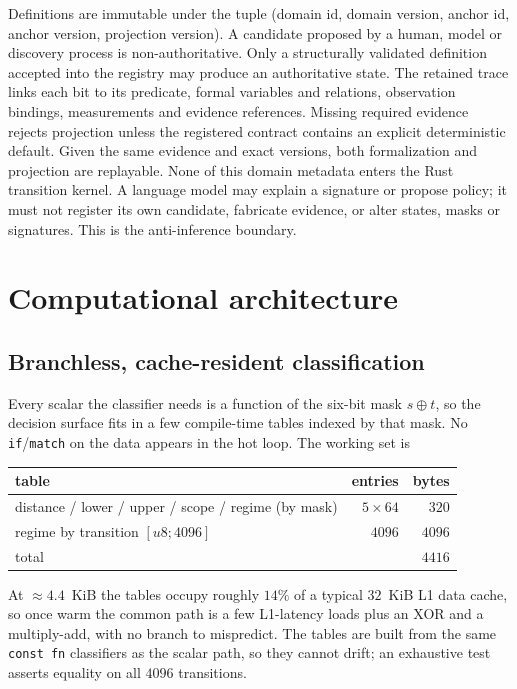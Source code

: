 \documentclass[11pt,a4paper]{article}
\begin{document}
Definitions are immutable under the tuple (domain id, domain version, anchor id,
anchor version, projection version). A candidate proposed by a human, model or
discovery process is non-authoritative. Only a structurally validated definition
accepted into the registry may produce an authoritative state. The retained trace
links each bit to its predicate, formal variables and relations, observation
bindings, measurements and evidence references. Missing required evidence rejects
projection unless the registered contract contains an explicit deterministic
default. Given the same evidence and exact versions, both formalization and
projection are replayable. None of this domain metadata enters the Rust transition
kernel. A language model may explain a signature or propose policy; it must not
register its own candidate, fabricate evidence, or alter states, masks or
signatures. This is the anti-inference boundary.

\section{Computational architecture}
\subsection{Branchless, cache-resident classification}
Every scalar the classifier needs is a function of the six-bit mask $s\oplus t$,
so the decision surface fits in a few compile-time tables indexed by that mask. No
\texttt{if}/\texttt{match} on the data appears in the hot loop. The working set is
\begin{center}
\begin{tabular}{lrr}
\toprule
table & entries & bytes \\
\midrule
distance / lower / upper / scope / regime (by mask) & $5\times 64$ & $320$ \\
regime by transition $[u8;4096]$ & $4096$ & $4096$ \\
\midrule
total & & $4416$ \\
\bottomrule
\end{tabular}
\end{center}
At $\approx 4.4$~KiB the tables occupy roughly $14\%$ of a typical $32$~KiB L1 data
cache, so once warm the common path is a few L1-latency loads plus an XOR and a
multiply-add, with no branch to mispredict. The tables are built from the same
\texttt{const fn} classifiers as the scalar path, so they cannot drift; an
exhaustive test asserts equality on all $4096$ transitions.
\end{document}
